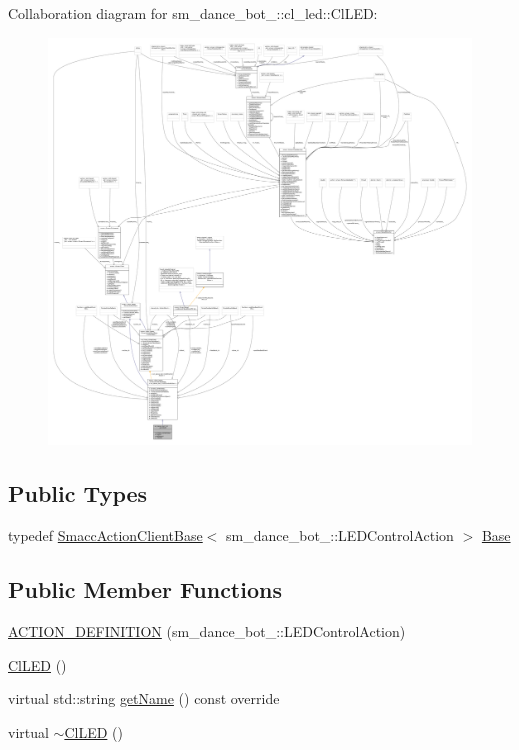 Collaboration diagram for sm\+\_\+dance\+\_\+bot\+\_\+:\+:cl\+\_\+led\+:\+:Cl\+L\+ED\+:
\nopagebreak
\begin{figure}[H]
\begin{center}
\leavevmode
\includegraphics[width=350pt]{classsm__dance__bot__3_1_1cl__led_1_1ClLED__coll__graph}
\end{center}
\end{figure}
\subsection*{Public Types}
\begin{DoxyCompactItemize}
\item 
typedef \hyperlink{classsmacc_1_1client__bases_1_1SmaccActionClientBase_af38f27dd26f8a87fea6b3eaa4a84e604}{Smacc\+Action\+Client\+Base}$<$ sm\+\_\+dance\+\_\+bot\+\_\+::\+L\+E\+D\+Control\+Action $>$ \hyperlink{classsm__dance__bot__3_1_1cl__led_1_1ClLED_ae78f33687da66a5c49ebca045cd00951}{Base}
\end{DoxyCompactItemize}
\subsection*{Public Member Functions}
\begin{DoxyCompactItemize}
\item 
\hyperlink{classsm__dance__bot__3_1_1cl__led_1_1ClLED_a22eed70ddbce96a6207062fdb635f719}{A\+C\+T\+I\+O\+N\+\_\+\+D\+E\+F\+I\+N\+I\+T\+I\+ON} (sm\+\_\+dance\+\_\+bot\+\_\+::\+L\+E\+D\+Control\+Action)
\item 
\hyperlink{classsm__dance__bot__3_1_1cl__led_1_1ClLED_ae723d91532a1a059f5ec716a9706a445}{Cl\+L\+ED} ()
\item 
virtual std\+::string \hyperlink{classsm__dance__bot__3_1_1cl__led_1_1ClLED_a18bff383986af7ae46ed498abca66bda}{get\+Name} () const override
\item 
virtual \hyperlink{classsm__dance__bot__3_1_1cl__led_1_1ClLED_a554d05dd7c158e5221a2122c5f183cc6}{$\sim$\+Cl\+L\+ED} ()
\end{DoxyCompactItemize}
